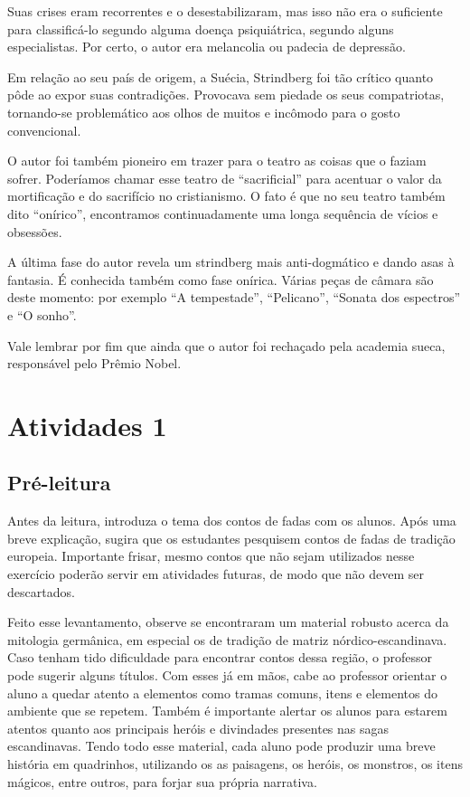 \documentclass[12pt]{extarticle}
\begin{document}
Suas crises eram recorrentes e o desestabilizaram, mas isso não era o suficiente para classificá-lo 
segundo alguma doença psiquiátrica, segundo alguns especialistas. 
Por certo, o autor era melancolia ou padecia de depressão.

Em relação ao seu país de origem, a Suécia, Strindberg foi tão 
crítico quanto pôde ao expor suas contradições.
Provocava sem piedade os seus compatriotas, tornando-se problemático aos olhos de muitos e incômodo para o gosto convencional.

O autor foi também pioneiro em trazer para o teatro as coisas que o faziam sofrer. Poderíamos chamar esse teatro de “sacrificial” para acentuar o valor da mortificação e do sacrifício no cristianismo. 
O fato é que no seu teatro também dito “onírico”, encontramos continuadamente uma longa sequência 
de vícios e obsessões. 

A última fase do autor revela um strindberg mais anti-dogmático e dando asas à fantasia. É conhecida também 
como fase onírica. Várias peças de câmara são deste momento: por exemplo “A tempestade”, “Pelicano”, 
“Sonata dos espectros” e “O sonho”.


Vale lembrar por fim que ainda que o autor foi rechaçado pela academia sueca, responsável pelo Prêmio Nobel.



\section{Atividades 1}


\subsection{Pré-leitura}


Antes da leitura, introduza o tema dos contos de fadas com
os alunos. Após uma breve explicação, sugira que os estudantes pesquisem
contos de fadas de tradição europeia. Importante frisar, mesmo contos
que não sejam utilizados nesse exercício poderão servir em atividades
futuras, de modo que não devem ser descartados.

Feito esse levantamento, observe se encontraram um material robusto
acerca da mitologia germânica, em especial os de tradição de matriz
nórdico-escandinava. Caso tenham tido dificuldade para encontrar contos
dessa região, o professor pode sugerir alguns títulos. Com esses já em
mãos, cabe ao professor orientar o aluno a quedar atento a elementos
como tramas comuns, itens e elementos do ambiente que se repetem. Também
é importante alertar os alunos para estarem atentos quanto aos
principais heróis e divindades presentes nas sagas escandinavas. Tendo
todo esse material, cada aluno pode produzir uma breve história em
quadrinhos, utilizando os as paisagens, os heróis, os monstros, os itens
mágicos, entre outros, para forjar sua própria narrativa.
\end{document}
